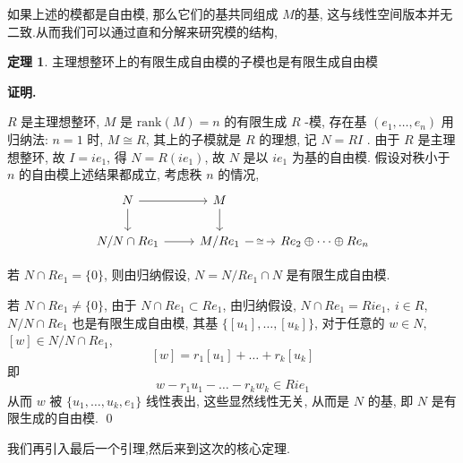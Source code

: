 \documentclass[12pt, a4paper,oneside, UTF8]{ctexart}
\theoremstyle{definition}
\newtheorem{thm}[lemma]{\indent 定理}
\theoremstyle{plain}
\renewenvironment{proof}{\par\textbf{证明.}\;}{\qed\par} %
\begin{document}
如果上述的模都是自由模, 那么它们的基共同组成 $M$的基, 这与线性空间版本并无二致.从而我们可以通过直和分解来研究模的结构, 
\begin{thm}
    主理想整环上的有限生成自由模的子模也是有限生成自由模
\end{thm}
\begin{proof}

    $R$ 是主理想整环,  $M$ 是 $\mathrm{rank}(M) = n$ 的有限生成 $R$ -模,  存在基 $(e_{1},\dots,e_{n})$ 用归纳法: $n =1$ 时,  $M \cong R$, 其上的子模就是 $R$ 的理想, 记 $N = RI$ . 由于 $R$ 是主理想整环, 故 $I =ie_{1}$, 得 $N = R(ie_{1})$, 故 $N$ 是以 $ie_{1}$ 为基的自由模.
假设对秩小于 $n$ 的自由模上述结果都成立, 考虑秩 $n$ 的情况,  
\vspace*{2em}
\[\begin{tikzcd}
	N & M \\
	{N/N\cap Re_1} & {M/Re_1 } & {Re_2 \oplus\cdots\oplus Re_n}
	\arrow[from=1-1, to=1-2]
	\arrow[from=1-1, to=2-1]
	\arrow[from=1-2, to=2-2]
	\arrow[from=2-1, to=2-2]
	\arrow["\cong"{description}, from=2-2, to=2-3]
\end{tikzcd}\]

若 $N \cap R e_{1} =\{ 0 \}$, 则由归纳假设,  $N = N/ R e_{1}\cap N$ 是有限生成自由模.

若 $N \cap R e_{1} \neq\{ 0 \}$, 由于 $N \cap R e_{1} \subset R e_{1}$, 由归纳假设, $N \cap R e_{1}=Ri e_{1}, \ i \in R$, $N / N \cap R e_{1}$ 也是有限生成自由模, 其基 $\{ [u_{1}],\dots,[u_{k}] \}$, 对于任意的 $w \in N$,  $[w] \in N / N \cap R e_{1}$,
$$[w] =r_{1}[u_{1}]+\dots +r_{k}[u_{k}]$$
即
$$w -r_{1}u_{1}-\dots-r_{k}w_{k}\in R i e_{1}$$
从而 $w$ 被 $\{ u_{1},\dots,u_{k},e_{1} \}$ 线性表出, 这些显然线性无关, 从而是 $N$ 的基, 即 $N$ 是有限生成的自由模.  
\end{proof}


我们再引入最后一个引理,然后来到这次的核心定理.
\end{document}
